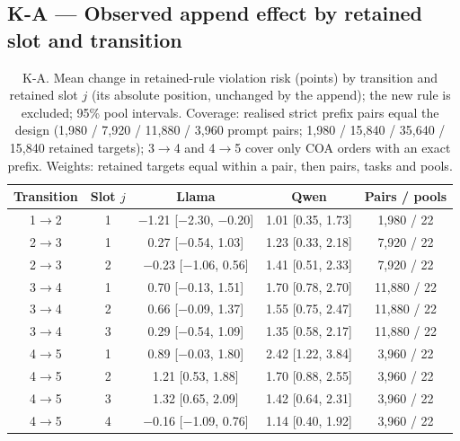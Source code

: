 \subsection*{K-A --- Observed append effect by retained slot and transition}
\begin{table}[h]
\centering\scriptsize
\caption{K-A. Mean change in retained-rule violation risk (points) by transition and retained slot $j$ (its absolute position, unchanged by the append); the new rule is excluded; 95\% pool intervals. Coverage: realised strict prefix pairs equal the design (1,980 / 7,920 / 11,880 / 3,960 prompt pairs; 1,980 / 15,840 / 35,640 / 15,840 retained targets); 3$\to$4 and 4$\to$5 cover only COA orders with an exact prefix. Weights: retained targets equal within a pair, then pairs, tasks and pools.}
\label{tab:KA}
\begin{tabular}{ccccc}
\toprule
Transition & Slot $j$ & Llama & Qwen & Pairs / pools \\
\midrule
1$\to$2 & 1 & $-$1.21 [$-$2.30, $-$0.20] & 1.01 [0.35, 1.73] & 1,980 / 22 \\
2$\to$3 & 1 & 0.27 [$-$0.54, 1.03] & 1.23 [0.33, 2.18] & 7,920 / 22 \\
2$\to$3 & 2 & $-$0.23 [$-$1.06, 0.56] & 1.41 [0.51, 2.33] & 7,920 / 22 \\
3$\to$4 & 1 & 0.70 [$-$0.13, 1.51] & 1.70 [0.78, 2.70] & 11,880 / 22 \\
3$\to$4 & 2 & 0.66 [$-$0.09, 1.37] & 1.55 [0.75, 2.47] & 11,880 / 22 \\
3$\to$4 & 3 & 0.29 [$-$0.54, 1.09] & 1.35 [0.58, 2.17] & 11,880 / 22 \\
4$\to$5 & 1 & 0.89 [$-$0.03, 1.80] & 2.42 [1.22, 3.84] & 3,960 / 22 \\
4$\to$5 & 2 & 1.21 [0.53, 1.88] & 1.70 [0.88, 2.55] & 3,960 / 22 \\
4$\to$5 & 3 & 1.32 [0.65, 2.09] & 1.42 [0.64, 2.31] & 3,960 / 22 \\
4$\to$5 & 4 & $-$0.16 [$-$1.09, 0.76] & 1.14 [0.40, 1.92] & 3,960 / 22 \\
\bottomrule
\end{tabular}
\end{table}

